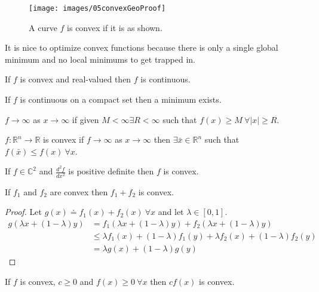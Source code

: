 \begin{figure}[ht!]
\centering
\texttt{[image: images/05convexGeoProof]}
\caption{A curve $f$ is convex if it is as shown.}%
\label{fig:05convexGeoProof}
\end{figure}

It is nice to optimize convex functions because there is only a single global minimum and no local minimums to get trapped in.

\begin{theorem}
If $f$ is convex and real-valued then $f$ is continuous.
\end{theorem}

\begin{theorem}
If $f$ is continuous on a compact set then a minimum exists.
\end{theorem}

\begin{definition}
$f\to\infty$ as $x\to\infty$ if given $M<\infty \exists R<\infty$ such that $f(x)\geq M~\forall |x|\geq R$.
\end{definition}

\begin{theorem}
$f:\mathbb{R}^n\to\mathbb{R}$ is convex if $f\to\infty$ as $x\to\infty$ then $\exists \bar{x}\in\mathbb{R}^n$ such that $f(\bar{x})\leq f(x)~\forall x$.
\end{theorem}

\begin{theorem}
If $f\in\mathbb{C}^2$ and $\frac{d^2f}{dx^2}$ is positive definite then $f$ is convex.
\end{theorem}

\begin{theorem}%
\label{th:sumConvex}
If $f_1$ and $f_2$ are convex then $f_1+f_2$ is convex.
\end{theorem}

\begin{proof}
Let $g(x) \doteq f_1(x) + f_2(x)~\forall x$ and let $\lambda\in[0,1]$.
\begin{align*}
g(\lambda x + (1-\lambda)y) &= f_1(\lambda x+(1-\lambda)y) + f_2(\lambda x+(1-\lambda)y) \\
&\leq \lambda f_1(x) + (1-\lambda)f_1(y) + \lambda f_2(x) + (1-\lambda)f_2(y) \\
&= \lambda g(x) + (1-\lambda)g(y)
\end{align*}
\end{proof}

\begin{theorem}%
\label{th:cfxconvex}
If $f$ is convex, $c\geq 0$ and $f(x)\geq 0~\forall x$ then $cf(x)$ is convex.
\end{theorem}

